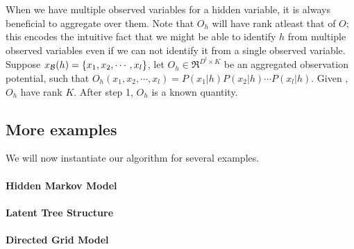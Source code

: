 When we have multiple observed variables for a hidden variable, it is
  always beneficial to aggregate over them.
Note that $O_h$ will have rank atleast that of $O$; this encodes the
  intuitive fact that we might be able to identify $h$ from multiple
  observed variables even if we can not identify it from a single
  observed variable. 
Suppose $x_{\mathcal{B}}(h) = \{x_1, x_2, \cdots, x_l\}$, let $O_h \in
  \Re^{D^l \times K}$ be an
  aggregated observation potential, such that $O_h(x_1, x_2, \cdots,
  x_l) = P(x_1|h) P(x_2|h) \cdots P(x_l|h)$.
Given , $O_h$ have rank $K$.
After step 1, $O_h$ is a known quantity.

\subsection{More examples}

We will now instantiate our algorithm for several examples.

\paragraph{Hidden Markov Model}

\paragraph{Latent Tree Structure}

\paragraph{Directed Grid Model}


